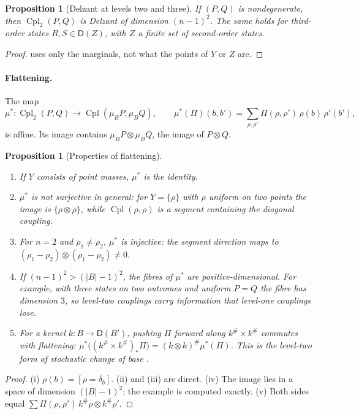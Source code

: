 \documentclass[11pt]{article}
\newtheorem{proposition}[theorem]{Proposition}
\theoremstyle{definition}
\theoremstyle{remark}
\newcommand{\D}{\mathsf{D}}
\newcommand{\Cpl}{\operatorname{Cpl}}
\begin{document}
\begin{proposition}[Delzant at levels two and three]\label{prop:l23}
If $(P,Q)$ is nondegenerate, then $\Cpl_2(P,Q)$ is Delzant of dimension $(n-1)^2$. The same holds for
third-order states $R,S\in\D(Z)$, with $Z$ a finite set of second-order states.
\end{proposition}
\begin{proof}
 uses only the marginals, not what the points of $Y$ or $Z$ are.
\end{proof}

\paragraph{Flattening.} The map
\[
\mu^*\colon\Cpl_2(P,Q)\to\Cpl(\mu_BP,\mu_BQ),\qquad
\mu^*(\Pi)(b,b')=\sum_{\rho,\rho'}\Pi(\rho,\rho')\,\rho(b)\,\rho'(b'),
\]
is affine. Its image contains $\mu_BP\otimes\mu_BQ$, the image of $P\otimes Q$.

\begin{proposition}[Properties of flattening]\label{prop:flat}
\leavevmode
\begin{enumerate}[label=(\roman*)]
\item If $Y$ consists of point masses, $\mu^*$ is the identity.
\item $\mu^*$ is not surjective in general: for $Y=\{\rho\}$ with $\rho$ uniform on two points the image is
  $\{\rho\otimes\rho\}$, while $\Cpl(\rho,\rho)$ is a segment containing the diagonal coupling.
\item For $n=2$ and $\rho_1\ne\rho_2$, $\mu^*$ is injective: the segment direction maps to
  $(\rho_1-\rho_2)\otimes(\rho_1-\rho_2)\ne0$.
\item If $(n-1)^2>(\lvert B\rvert-1)^2$, the fibres of $\mu^*$ are positive-dimensional. For example, with three
  states on two outcomes and uniform $P=Q$ the fibre has dimension $3$, so level-two couplings carry
  information that level-one couplings lose.
\item For a kernel $k\colon B\to\D(B')$, pushing $\Pi$ forward along $k^\#\times k^\#$ commutes with flattening:
  $\mu^*\big((k^\#\times k^\#)_*\Pi\big)=(k\otimes k)^\#\mu^*(\Pi)$. This is the level-two form of stochastic
  change of base \cite[Prop.~9.14]{Tower}.
\end{enumerate}
\end{proposition}
\begin{proof}
(i) $\rho(b)=[\rho=\delta_b]$. (ii) and (iii) are direct. (iv) The image lies in a space of dimension
$(\lvert B\rvert-1)^2$; the example is computed exactly. (v) Both sides equal
$\sum\Pi(\rho,\rho')\,k^\#\rho\otimes k^\#\rho'$.
\end{proof}
\end{document}
